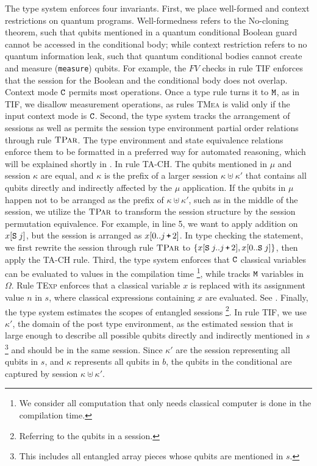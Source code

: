 The type system enforces four invariants.  First, we place well-formed and context restrictions on quantum programs.
Well-formedness refers to the No-cloning theorem, such that qubits mentioned in a quantum conditional Boolean guard cannot be accessed in the conditional body; while context restriction refers to no quantum information leak, such that quantum conditional bodies cannot create and measure (\texttt{measure}) qubits.
For example, the $FV$ checks in rule \textsc{TIF} enforces that the session for the Boolean and the conditional body does not overlap.
Context mode $\texttt{C}$ permits most \qafny operations. Once a type rule turns it to $\texttt{M}$, as in \textsc{TIF}, we disallow measurement operations, as rules \textsc{TMea} is valid only if the input context mode is $\texttt{C}$.
Second, the type system tracks the arrangement of sessions as well as permits the session type environment partial order relations through rule $\textsc{TPar}$. The type environment and state equivalence relations enforce them to be formatted in a preferred way for automated reasoning, which will be explained shortly in . 
In rule \textsc{TA-CH}. The qubits mentioned in $\mu$ and session $\kappa$ are equal, and $\kappa$ is the prefix of a larger session $\kappa \uplus \kappa'$ that contains all qubits directly and indirectly affected by the $\mu$ application.
If the qubits in $\mu$ happen not to be arranged as the prefix of $\kappa \uplus \kappa'$, such as in the middle of the session, we utilize the $\textsc{TPar}$ to transform the session structure by the session permutation equivalence. For example, in  line 5, we want to apply addition on $x[\texttt{S}\;j]$, but the session is arranged as $x[0..j\,\texttt{+}\,2]$. In type checking the statement, we first rewrite the session through rule $\textsc{TPar}$ to $\{x[\texttt{S}\;j..j\,\texttt{+}\,2],x[0..\texttt{S}\;j]\}$, then apply the \textsc{TA-CH} rule.
Third, the type system enforces that $\texttt{C}$ classical variables can be evaluated to values in the compilation time \footnote{We consider all computation that only needs classical computer is done in the compilation time.}, while tracks $\texttt{M}$ variables in $\Omega$. Rule \textsc{TExp} enforces that a classical variable $x$ is replaced with its assignment value $n$ in $s$, where classical expressions containing $x$ are evaluated. See .
Finally, the type system estimates the scopes of entangled sessions \footnote{Referring to the qubits in a session.}. In rule \textsc{TIF}, we use $\kappa'$, the domain of the post type environment, as the estimated session that is large enough to describe all possible qubits directly and indirectly mentioned in $s$ \footnote{This includes all entangled array pieces whose qubits are mentioned in $s$. } and should be in the same session. Since $\kappa'$ are the session representing all qubits in $s$, and $\kappa$ represents all qubits in $b$, the qubits in the conditional are captured by session $\kappa \uplus \kappa'$.


